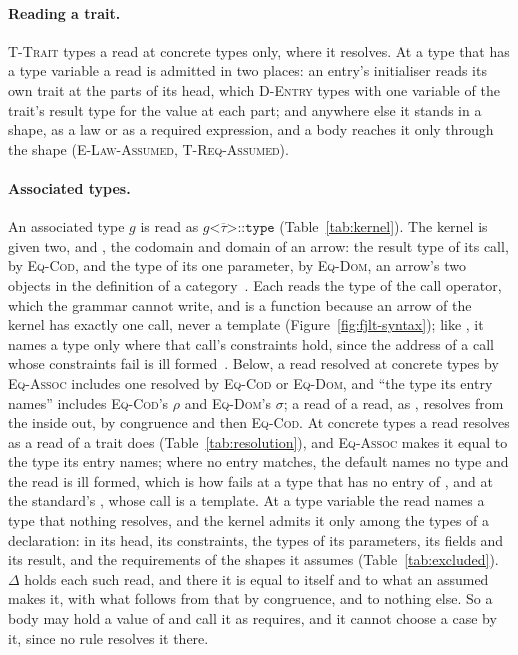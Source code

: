 \paragraph{Reading a trait.}
\label{app:fjlt:trait}
\textsc{T-Trait} types a read at concrete types only, where it resolves.
At a type that has a type variable a read is admitted in two places: an entry's initialiser reads its own trait at the parts of its head, which \textsc{D-Entry} types with one variable of the trait's result type for the value at each part; and anywhere else it stands in a shape, as a law or as a required expression, and a body reaches it only through the shape (\textsc{E-Law-Assumed}, \textsc{T-Req-Assumed}).

\paragraph{Associated types.}
\label{app:fjlt:assoc}
An associated type $g$ is read as $g\texttt{<}\overline{\tau}\texttt{>::type}$ (Table~\ref{tab:kernel}).
The kernel is given two,  and , the codomain and domain of an arrow: the result type of its call, by \textsc{Eq-Cod}, and the type of its one parameter, by \textsc{Eq-Dom}, an arrow's two objects in the definition of a category~\cite[Definition~1.1.1]{pierce1991basic}.
Each reads the type of the call operator, which the grammar cannot write, and is a function because an arrow of the kernel has exactly one call, never a template (Figure~\ref{fig:fjlt-syntax}); like \Cpp{}, it names a type only where that call's constraints hold, since the address of a call whose constraints fail is ill formed~\cite[\texttt{expr.prim.id.general}]{cpp23standard}.
Below, a read resolved at concrete types by \textsc{Eq-Assoc} includes one resolved by \textsc{Eq-Cod} or \textsc{Eq-Dom}, and ``the type its entry names'' includes \textsc{Eq-Cod}'s $\rho$ and \textsc{Eq-Dom}'s $\sigma$; a read of a read, as , resolves from the inside out, by congruence and then \textsc{Eq-Cod}.
At concrete types a read resolves as a read of a trait does (Table~\ref{tab:resolution}), and \textsc{Eq-Assoc} makes it equal to the type its entry names; where no entry matches, the default names no type and the read is ill formed, which is how  fails at a type that has no entry of , and at the standard's , whose call is a template.
At a type variable the read names a type that nothing resolves, and the kernel admits it only among the types of a declaration: in its head, its constraints, the types of its parameters, its fields and its result, and the requirements of the shapes it assumes (Table~\ref{tab:excluded}).
$\Delta$ holds each such read, and there it is equal to itself and to what an assumed  makes it, with what follows from that by congruence, and to nothing else.
So a body may hold a value of  and call it as  requires, and it cannot choose a case by it, since no rule resolves it there.

